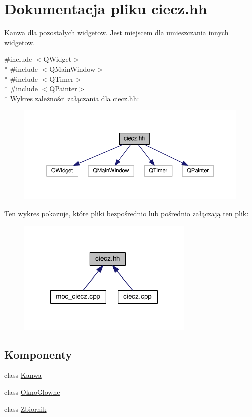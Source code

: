 \hypertarget{ciecz_8hh}{\section{Dokumentacja pliku ciecz.\-hh}
\label{ciecz_8hh}
}


\hyperlink{class_kanwa}{Kanwa} dla pozostalych widgetow. Jest miejscem dla umieszczania innych widgetow.  


{\ttfamily \#include $<$Q\-Widget$>$}\\*
{\ttfamily \#include $<$Q\-Main\-Window$>$}\\*
{\ttfamily \#include $<$Q\-Timer$>$}\\*
{\ttfamily \#include $<$Q\-Painter$>$}\\*
Wykres zależności załączania dla ciecz.\-hh\-:
\nopagebreak
\begin{figure}[H]
\begin{center}
\leavevmode
\includegraphics[width=350pt]{ciecz_8hh__incl}
\end{center}
\end{figure}
Ten wykres pokazuje, które pliki bezpośrednio lub pośrednio załączają ten plik\-:
\nopagebreak
\begin{figure}[H]
\begin{center}
\leavevmode
\includegraphics[width=239pt]{ciecz_8hh__dep__incl}
\end{center}
\end{figure}
\subsection*{Komponenty}
\begin{DoxyCompactItemize}
\item 
class \hyperlink{class_kanwa}{Kanwa}
\item 
class \hyperlink{class_okno_glowne}{Okno\-Glowne}
\item 
class \hyperlink{class_zbiornik}{Zbiornik}
\end{DoxyCompactItemize}


